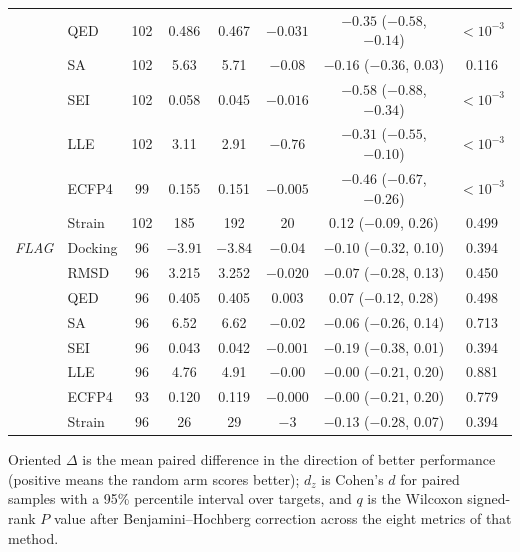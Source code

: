 \begin{samepage}
\begin{center}
\begin{tabular}{@{}llcccccc@{}}
 & QED & 102 & 0.486 & 0.467 & $-0.031$ & $-0.35$ ($-0.58$, $-0.14$) & $<10^{-3}$ \\
 & SA & 102 & 5.63 & 5.71 & $-0.08$ & $-0.16$ ($-0.36$, 0.03) & 0.116 \\
 & SEI & 102 & 0.058 & 0.045 & $-0.016$ & $-0.58$ ($-0.88$, $-0.34$) & $<10^{-3}$ \\
 & LLE & 102 & 3.11 & 2.91 & $-0.76$ & $-0.31$ ($-0.55$, $-0.10$) & $<10^{-3}$ \\
 & ECFP4 & 99 & 0.155 & 0.151 & $-0.005$ & $-0.46$ ($-0.67$, $-0.26$) & $<10^{-3}$ \\
 & Strain & 102 & 185 & 192 & 20 & 0.12 ($-0.09$, 0.26) & 0.499 \\
\midrule
\textit{FLAG} & Docking & 96 & $-3.91$ & $-3.84$ & $-0.04$ & $-0.10$ ($-0.32$, 0.10) & 0.394 \\
 & RMSD & 96 & 3.215 & 3.252 & $-0.020$ & $-0.07$ ($-0.28$, 0.13) & 0.450 \\
 & QED & 96 & 0.405 & 0.405 & 0.003 & 0.07 ($-0.12$, 0.28) & 0.498 \\
 & SA & 96 & 6.52 & 6.62 & $-0.02$ & $-0.06$ ($-0.26$, 0.14) & 0.713 \\
 & SEI & 96 & 0.043 & 0.042 & $-0.001$ & $-0.19$ ($-0.38$, 0.01) & 0.394 \\
 & LLE & 96 & 4.76 & 4.91 & $-0.00$ & $-0.00$ ($-0.21$, 0.20) & 0.881 \\
 & ECFP4 & 93 & 0.120 & 0.119 & $-0.000$ & $-0.00$ ($-0.21$, 0.20) & 0.779 \\
 & Strain & 96 & 26 & 29 & $-3$ & $-0.13$ ($-0.28$, 0.07) & 0.394 \\
\midrule
\bottomrule
\end{tabular}\end{center}

Oriented $\Delta$ is the mean paired difference in the direction of better performance (positive means the random arm scores better); $d_z$ is Cohen's $d$ for paired samples with a 95\% percentile interval over targets, and $q$ is the Wilcoxon signed-rank $P$ value after Benjamini--Hochberg correction across the eight metrics of that method.

\end{samepage}
